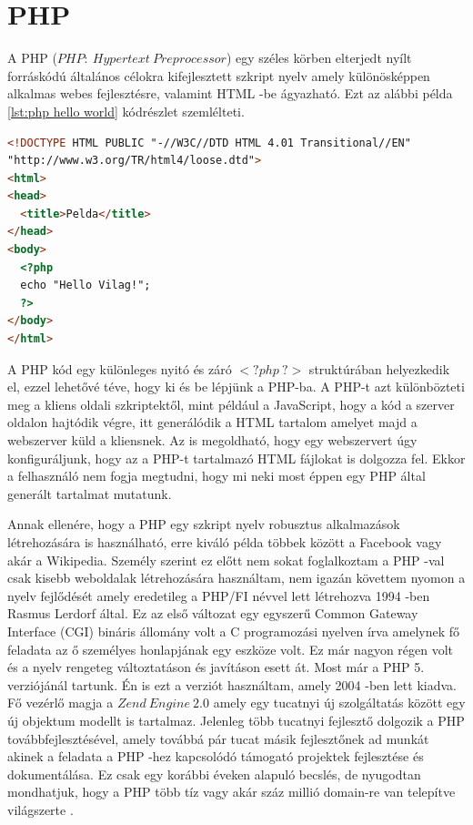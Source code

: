 \documentclass[12pt]{report}
\theoremstyle{definition}
\begin{document}
	\section{PHP}
	A PHP ($PHP:\ Hypertext\ Preprocessor$) egy széles körben elterjedt nyílt forráskódú általános célokra kifejlesztett szkript nyelv amely különösképpen alkalmas webes fejlesztésre, valamint HTML -be ágyazható. Ezt az alábbi példa \ref{lst:php hello world} kódrészlet szemlélteti.
	\noindent\begin{minipage}{\linewidth}
		\begin{lstlisting}[language=html,label={lst:php hello world}, caption={PHP Hello World!}]
<!DOCTYPE HTML PUBLIC "-//W3C//DTD HTML 4.01 Transitional//EN"
"http://www.w3.org/TR/html4/loose.dtd">
<html>
<head>
  <title>Pelda</title>
</head>
<body>
  <?php
  echo "Hello Vilag!";
  ?>
</body>
</html>
		\end{lstlisting}
	\end{minipage}
	A PHP kód egy különleges nyitó és záró $<?php\ ?>$ struktúrában helyezkedik el, ezzel lehetővé téve, hogy ki és be lépjünk a PHP-ba. A PHP-t azt különbözteti meg a kliens oldali szkriptektől, mint például a JavaScript, hogy a kód a szerver oldalon hajtódik végre, itt generálódik a HTML tartalom amelyet majd a webszerver küld a kliensnek. Az is megoldható, hogy egy webszervert úgy konfiguráljunk, hogy az a PHP-t tartalmazó HTML fájlokat is dolgozza fel. Ekkor a felhasználó nem fogja megtudni, hogy mi neki most éppen egy PHP által generált tartalmat mutatunk.
	
	Annak ellenére, hogy a PHP egy szkript nyelv robusztus alkalmazások létrehozására is használható, erre kiváló példa többek között a Facebook vagy akár a Wikipedia. Személy szerint ez előtt nem sokat foglalkoztam a PHP -val csak kisebb weboldalak létrehozására használtam, nem igazán követtem nyomon a nyelv fejlődését amely eredetileg a PHP/FI névvel lett létrehozva 1994 -ben Rasmus Lerdorf által. Ez az első változat egy egyszerű Common Gateway Interface (CGI) bináris állomány volt a C programozási nyelven írva amelynek fő feladata az ő személyes honlapjának egy eszköze volt. Ez már nagyon régen volt és a nyelv rengeteg változtatáson és javításon esett át. Most már a PHP 5. verziójánál tartunk. Én is ezt a verziót használtam, amely 2004 -ben lett kiadva. Fő vezérlő magja a $Zend\ Engine\ 2.0$ amely egy tucatnyi új szolgáltatás között egy új objektum modellt is tartalmaz. Jelenleg több tucatnyi fejlesztő dolgozik a PHP továbbfejlesztésével, amely továbbá pár tucat másik fejlesztőnek ad munkát akinek a feladata a PHP -hez kapcsolódó támogató projektek fejlesztése és dokumentálása. Ez csak egy korábbi éveken alapuló becslés, de nyugodtan mondhatjuk, hogy a PHP több tíz vagy akár száz millió domain-re van telepítve világszerte \cite{php-history}.
	
\end{document}
